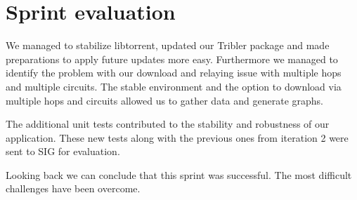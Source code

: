 	\section{Sprint evaluation}
		We managed to stabilize libtorrent, updated our Tribler package and made preparations to apply future updates more easy. Furthermore we managed to identify the problem with our download and relaying issue with multiple hops and multiple circuits. The stable environment and the option to download via multiple hops and circuits allowed us to gather data and generate graphs.
		
		The additional unit tests contributed to the stability and robustness of our application. These new tests along with the previous ones from iteration 2 were sent to SIG for evaluation.
		
		Looking back we can conclude that this sprint was successful. The most difficult challenges have been overcome.
